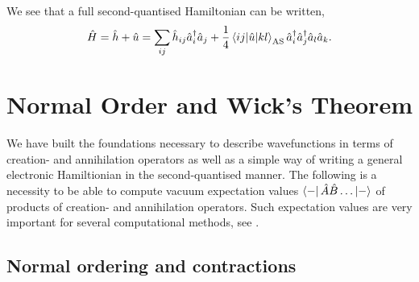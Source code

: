     We see that a full second-quantised Hamiltonian can be written,
    \begin{equation}
        \label{eq:second_quant_hamiltionian}
        \hat{H} = \hat{h} + \hat{u} 
        = \sum_{ij} \hat{h}_{ij}\hat{a}^\dagger_i \hat{a}_j
            + \frac{1}{4} \mel{ij}{\hat{u}}{kl}_\text{AS}
            \hat{a}^\dagger_i \hat{a}^\dagger_j \hat{a}_l \hat{a}_k.
    \end{equation}

\section{Normal Order and Wick's Theorem}

    We have built the foundations necessary to describe wavefunctions in terms
    of creation- and annihilation operators as well as a simple way of writing
    a general electronic Hamiltionian in the second-quantised manner. The following
    is a necessity to be able to compute vacuum expectation values 
    $\bra{-} \hat{A} \hat{B} \dots \ket{-}$ of products of creation- 
    and annihilation operators. Such expectation values are very important for 
    several computational methods, see \citeauthor{harris1992algebraic}\cite{harris1992algebraic}.

        \subsection{Normal ordering and contractions}

